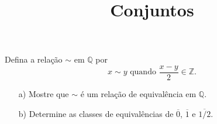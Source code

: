 \documentclass{beamer}
\title{Conjuntos}
\author[\autor]{\autor}
\institute[\instituto]{\instituto}
\date{}
\begin{document}
    \begin{frame}
        \maketitle
    \end{frame}


    \begin{frame}
        \begin{exercicio}
            Defina a relação $\sim$ em $\mathbb{Q}$ por
            \[
                x \sim y \mbox{ quando } \dfrac{x - y}{2} \in \mathbb{Z}.
            \]
            \begin{enumerate}
                \item[a)] Mostre que $\sim$ é um relação de equivalência em $\mathbb{Q}$.
                \item[b)] Determine as classes de equivalências de $\overline{0}$, $\overline{1}$ e $\overline{1/2}$.
            \end{enumerate}
        \end{exercicio}

        \vspace{6cm}
    \end{frame}
\end{document}
